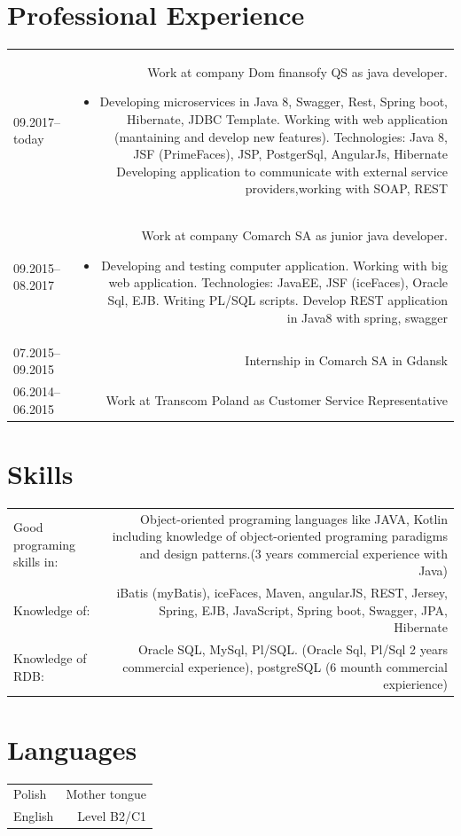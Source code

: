 \documentclass[1pt]{my_cv}
\begin{document}
	\section*{Professional Experience}
	\begin{tabular}{L!{\VRule}R}
		09.2017--today&{Work at company Dom finansofy QS as java developer.}
			\begin{itemize}  
				\item{Developing microservices in Java 8, Swagger, Rest, Spring boot, Hibernate, JDBC Template.}
				{Working with web application (mantaining and develop new features). Technologies: Java 8, JSF (PrimeFaces), JSP, PostgerSql, AngularJs, Hibernate }
				{Developing application to communicate with external service providers,working with SOAP, REST}	
			\end{itemize}\\
		09.2015--08.2017&{Work at company Comarch SA as junior java developer.}
		\begin{itemize}  
			\item{Developing and testing computer application.}
			{Working with big web application. Technologies: JavaEE, JSF (iceFaces), Oracle Sql, EJB.}
			{Writing PL/SQL scripts.}			
			{Develop REST application in Java8 with spring, swagger}
		\end{itemize}\\
		07.2015--09.2015&{Internship in Comarch SA in Gdansk}\\
		06.2014--06.2015&{Work at Transcom Poland as Customer Service Representative} 
	\end{tabular}
	\section*{Skills}
	\begin{tabular}{L!{\VRule}R}
		Good programing skills in:&Object-oriented programing languages like JAVA, Kotlin including knowledge of object-oriented programing paradigms and design patterns.(3 years commercial experience with Java)\\
		Knowledge of:&iBatis (myBatis), iceFaces, Maven, angularJS, REST, Jersey, Spring, EJB, JavaScript, Spring boot, Swagger, JPA, Hibernate\\
		Knowledge of RDB:& Oracle SQL, MySql, Pl/SQL. (Oracle Sql, Pl/Sql 2 years commercial experience), postgreSQL (6 mounth commercial expierience)
	\end{tabular}
	\section*{Languages}
	\begin{tabular}{L!{\VRule}R}
		Polish&Mother tongue\\
		English&Level B2/C1
	\end{tabular}
\end{document}
